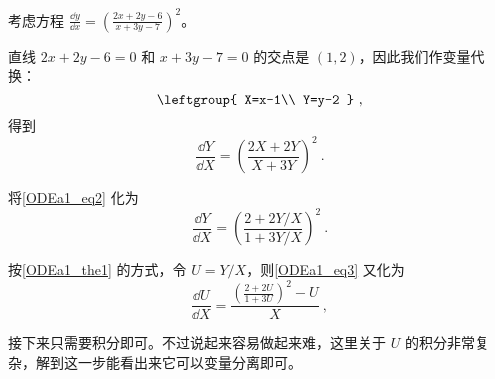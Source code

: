 \begin{example}{}
考虑方程 $\frac{\dd y}{\dd x}=(\frac{2x+2y-6}{x+3y-7})^2$。

直线 $2x+2y-6=0$ 和 $x+3y-7=0$ 的交点是 $(1, 2)$，因此我们作变量代换：
\begin{equation}
\leftgroup{
    X=x-1\\
    Y=y-2
}~,
\end{equation}
得到
\begin{equation}\label{ODEa1_eq2}
\frac{\dd Y}{\dd X}=(\frac{2X+2Y}{X+3Y})^2~.
\end{equation}

将\autoref{ODEa1_eq2} 化为
\begin{equation}\label{ODEa1_eq3}
\frac{\dd Y}{\dd X}=(\frac{2+2Y/X}{1+3Y/X})^2~.
\end{equation}

按\autoref{ODEa1_the1} 的方式，令 $U=Y/X$，则\autoref{ODEa1_eq3} 又化为
\begin{equation}
\frac{\dd U}{\dd X}=\frac{(\frac{2+2U}{1+3U})^2-U}{X}~,
\end{equation}

接下来只需要积分即可。不过说起来容易做起来难，这里关于 $U$ 的积分非常复杂，解到这一步能看出来它可以变量分离即可。

\end{example}









